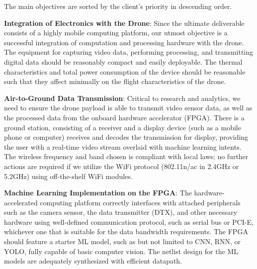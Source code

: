 The main objectives are sorted by the client's priority in descending order.

\textbf{Integration of Electronics with the Drone}:
Since the ultimate deliverable consists of a highly mobile computing platform,
our utmost objective is a successful integration of computation and processing hardware with the drone.
The equipment for capturing video data, performing processing, and transmitting digital data should be reasonably compact and easily deployable.
The thermal characteristics and total power consumption of the device should be reasonable such that they affect minimally
on the flight characteristics of the drone.

\textbf{Air-to-Ground Data Transmission}:
Critical to research and analytics, we need to ensure the drone payload is able to transmit video sensor data, as well as the processed data
from the onboard hardware accelerator (FPGA). There is a ground station, consisting of a receiver and a display device (such as a mobile phone or 
computer) receives and decodes the transmission for display, providing the user with a real-time video stream overlaid with machine learning intents.
The wireless frequency and band chosen is compliant with local laws; no further actions are required if we utilize the WiFi protocol (802.11n/ac in 2.4GHz or 5.2GHz)
using off-the-shelf WiFi modules.

\textbf{Machine Learning Implementation on the FPGA}:
The hardware-accelerated computing platform correctly interfaces with attached peripherals such as the camera sensor, the data transmitter (DTX), and other necessary hardware
using well-defined communication protocol, such as serial bus or PCI-E, whichever one that is suitable for the data bandwidth requirements. 
The FPGA should feature a starter ML model, such as but not limited to CNN, RNN, or YOLO, fully capable of basic computer vision.
The netlist design for the ML models are adequately synthesized with efficient datapath.
